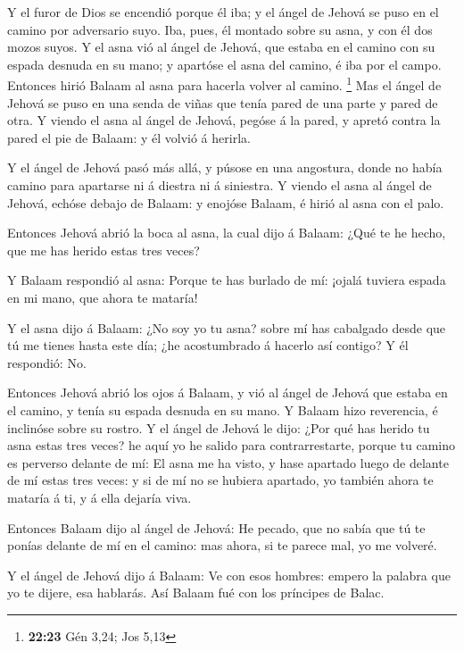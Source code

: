  Y el furor de Dios se encendió porque él iba; y el ángel
de Jehová se puso en el camino por adversario suyo. Iba, pues, él
montado sobre su asna, y con él dos mozos suyos.  Y el asna
vió al ángel de Jehová, que estaba en el camino con su espada desnuda en
su mano; y apartóse el asna del camino, é iba por el campo. Entonces
hirió Balaam al asna para hacerla volver al camino. \footnote{\textbf{22:23}
  Gén 3,24; Jos 5,13}  Mas el ángel de Jehová se puso en
una senda de viñas que tenía pared de una parte y pared de otra.
 Y viendo el asna al ángel de Jehová, pegóse á la pared, y
apretó contra la pared el pie de Balaam: y él volvió á herirla.

 Y el ángel de Jehová pasó más allá, y púsose en una
angostura, donde no había camino para apartarse ni á diestra ni á
siniestra.  Y viendo el asna al ángel de Jehová, echóse
debajo de Balaam: y enojóse Balaam, é hirió al asna con el palo.

 Entonces Jehová abrió la boca al asna, la cual dijo á
Balaam: ¿Qué te he hecho, que me has herido estas tres veces?

 Y Balaam respondió al asna: Porque te has burlado de mí:
¡ojalá tuviera espada en mi mano, que ahora te mataría!

 Y el asna dijo á Balaam: ¿No soy yo tu asna? sobre mí has
cabalgado desde que tú me tienes hasta este día; ¿he acostumbrado á
hacerlo así contigo? Y él respondió: No.~

 Entonces Jehová abrió los ojos á Balaam, y vió al ángel de
Jehová que estaba en el camino, y tenía su espada desnuda en su mano. Y
Balaam hizo reverencia, é inclinóse sobre su rostro.  Y el
ángel de Jehová le dijo: ¿Por qué has herido tu asna estas tres veces?
he aquí yo he salido para contrarrestarte, porque tu camino es perverso
delante de mí:  El asna me ha visto, y hase apartado luego
de delante de mí estas tres veces: y si de mí no se hubiera apartado, yo
también ahora te mataría á ti, y á ella dejaría viva.

 Entonces Balaam dijo al ángel de Jehová: He pecado, que no
sabía que tú te ponías delante de mí en el camino: mas ahora, si te
parece mal, yo me volveré.

 Y el ángel de Jehová dijo á Balaam: Ve con esos hombres:
empero la palabra que yo te dijere, esa hablarás. Así Balaam fué con los
príncipes de Balac.

